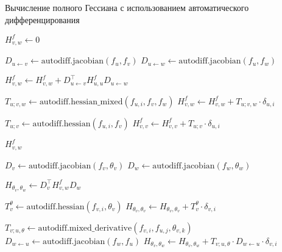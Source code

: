 \documentclass[11pt]{article}
\begin{document}
\begin{algorithm}
  \caption{Вычисление полного Гессиана с использованием автоматического дифференцирования}
  \label{alg:autodiff-hessian}
  \begin{algorithmic}[1]
    \State $H^f_{v,w} \gets 0$  

    \State $D_{u \gets v} \gets \text{autodiff.jacobian}(f_u, f_v)$
    \State $D_{u \gets w} \gets \text{autodiff.jacobian}(f_u, f_w)$

    \State $H^f_{v,w} \gets H^f_{v,w} + D_{u \gets v}^{\top} H^f_{u,u} D_{u \gets w}$ 

    \State $T_{u;v,w} \gets \text{autodiff.hessian\_mixed}(f_{u,i}, f_v, f_w)$ 
    \State $H^f_{v,w} \gets H^f_{v,w} + T_{u;v,w} \cdot \delta_{u,i}$ 
    \EndFor

    \State $T_{u;v} \gets \text{autodiff.hessian}(f_{u,i}, f_v)$ 
    \State $H^f_{v,v} \gets H^f_{v,v} + T_{u;v} \cdot \delta_{u,i}$ 
    \EndFor
    \EndIf
    \EndFor

    \State \Return $H^f_{v,w}$
    \EndFunction

    \State $D_v \gets \text{autodiff.jacobian}(f_v, \theta_v)$
    \State $D_w \gets \text{autodiff.jacobian}(f_w, \theta_w)$

    \State $H_{\theta_v, \theta_w} \gets D_v^{\top} H^f_{v,w} D_w$ 

    \State $T_v^{\theta} \gets \text{autodiff.hessian}(f_{v,i}, \theta_v)$ 
    \State $H_{\theta_v, \theta_v} \gets H_{\theta_v, \theta_v} + T_v^{\theta} \cdot \delta_{v,i}$
    \EndFor
    \EndIf

    \State $T_{v;u,\theta} \gets \text{autodiff.mixed\_derivative}(f_{v,i}, f_{u,j}, \theta_{v,k})$
    \State $D_{w \gets u} \gets \text{autodiff.jacobian}(f_w, f_u)$
    \State $H_{\theta_v, \theta_w} \gets H_{\theta_v, \theta_w} + T_{v;u,\theta} \cdot D_{w \gets u} \cdot \delta_{v,i}$
    \EndFor
    \EndFor
    \EndFor
    \EndFor


\end{algorithmic}
\end{algorithm}
\end{document}

